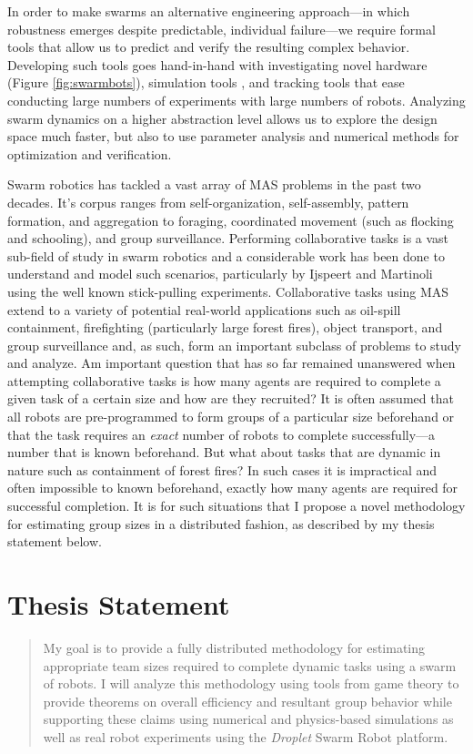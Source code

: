 \documentclass[11pt, onecolumn, compsoc, letterpaper]{article}
\begin{document}
In order to make swarms an alternative engineering approach---in which robustness emerges despite predictable, individual failure---we require formal tools that allow us to predict and verify the resulting complex behavior. Developing such tools goes hand-in-hand with investigating novel hardware (Figure \ref{fig:swarmbots}), simulation tools \cite{Michel1998}, and tracking tools \cite{correlliros06,lochmatter08} that ease conducting large numbers of experiments with large numbers of robots. Analyzing swarm dynamics on a higher abstraction level allows us to explore the design space much faster, but also to use parameter analysis and numerical methods for optimization and verification. 

Swarm robotics has tackled a vast array of MAS problems in the past two decades. It's corpus ranges from self-organization, self-assembly, pattern formation, and aggregation to foraging, coordinated movement (such as flocking and schooling), and group surveillance. Performing collaborative tasks is a vast sub-field of study in swarm robotics and a considerable work has been done to understand and model such scenarios, particularly by Ijspeert and Martinoli using the well known stick-pulling experiments. Collaborative tasks using MAS extend to a variety of potential real-world applications such as oil-spill containment, firefighting (particularly large forest fires), object transport, and group surveillance and, as such, form an important subclass of problems to study and analyze. Am important question that has so far remained unanswered when attempting collaborative tasks is how many agents are required to complete a given task of a certain size and how are they recruited? It is often assumed that all robots are pre-programmed to form groups of a particular size beforehand or that the task requires an \emph{exact} number of robots to complete successfully---a number that is known beforehand. But what about tasks that are dynamic in nature such as containment of forest fires? In  such cases it is impractical and often impossible to known beforehand, exactly how many agents are required for successful completion. It is for such situations that I propose a novel methodology for estimating group sizes in a distributed fashion, as described by my thesis statement below.

\section{Thesis Statement}
\begin{quote}
My goal is to provide a fully distributed methodology for estimating appropriate team sizes required to complete dynamic tasks using a swarm of robots. I will analyze this methodology using tools from game theory to provide theorems on overall efficiency and resultant group behavior while supporting these claims using numerical and physics-based simulations as well as real robot experiments using the \emph{Droplet} Swarm Robot platform.
\end{quote}
\end{document}
